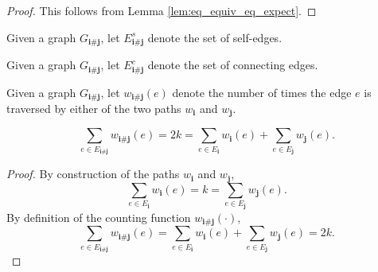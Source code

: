 \begin{proof}
This follows from Lemma \ref{lem:eq_equiv_eq_expect}.
\end{proof}


\begin{definition}
  \notready
  \label{def:graph_walk_triple_single_edges}
  Given a graph $G_{\mathbf{i} \# \mathbf{j}}$, let $E^s_{\mathbf{i} \# \mathbf{j}}$ denote the set of self-edges.
\end{definition}


\begin{definition}
  \notready
  \label{def:graph_walk_triple_connected_edges}
  Given a graph $G_{\mathbf{i} \# \mathbf{j}}$, let $E^c_{\mathbf{i} \# \mathbf{j}}$ denote the set of connecting edges.
\end{definition}


\begin{definition}
  \notready
  \label{def:edgeCountPair}
  Given a graph $G_{\mathbf{i} \# \mathbf{j}}$,
  let $w_{\mathbf{i} \# \mathbf{j}}(e)$ denote the number of times the edge $e$ is traversed by either of the two paths $w_\mathbf{i}$ and $w_\mathbf{j}$.
\end{definition}


\begin{lemma}
  \notready
  \label{lem:sum_count_edge_pair_eq_length_add_length}
  \[
  \sum_{e \in E_{\mathbf{i} \# \mathbf{j}}} w_{\mathbf{i} \# \mathbf{j}}(e)
  = 2k
  = \sum_{e \in E_\mathbf{i}} w_{\mathbf{i}}(e) + \sum_{e \in E_\mathbf{j}} w_{\mathbf{j}}(e).
  \]
\end{lemma}

\begin{proof}
  By construction of the paths $w_\mathbf{i}$ and $w_\mathbf{j}$,
  \[
  \sum_{e \in E_\mathbf{i}} w_{\mathbf{i}}(e) = k = \sum_{e \in E_\mathbf{j}} w_{\mathbf{j}}(e).
  \]
  By definition of the counting function $w_{\mathbf{i} \# \mathbf{j}}(\cdot)$,
  \[
  \sum_{e \in E_{\mathbf{i} \# \mathbf{j}}} w_{\mathbf{i} \# \mathbf{j}}(e)
  = \sum_{e \in E_\mathbf{i}} w_{\mathbf{i}}(e) + \sum_{e \in E_\mathbf{j}} w_{\mathbf{j}}(e)
  = 2k.
  \]
\end{proof}


